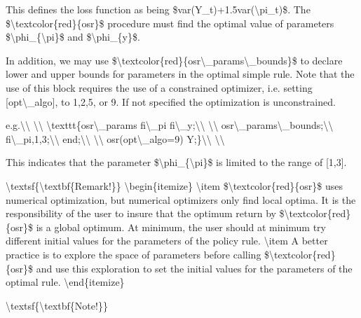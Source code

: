 \documentclass[10pt,math=newtx,citestyle=gb7714-2015,bibstyle=gb7714-2015]{elegantbook}
\begin{document}
	This defines the loss function as being \$var(Y\_t)+1.5var(\textbackslash{}pi\_t)\$. The \$\textbackslash{}textcolor\{red\}\{osr\}\$ procedure must find the optimal value of parameters \$\textbackslash{}phi\_\{\textbackslash{}pi\}\$ and \$\textbackslash{}phi\_\{y\}\$.
	
	In addition, we may use \$\textbackslash{}textcolor\{red\}\{osr\textbackslash{}\_params\textbackslash{}\_bounds\}\$ to declare lower and upper bounds for parameters in the optimal simple rule. Note that the use of this block requires the use of a constrained optimizer, i.e. setting [opt\textbackslash{}\_algo], to 1,2,5, or 9. If not specified the optimization is unconstrained.
	
	e.g.\textbackslash{}\textbackslash{}
	\textbackslash{}\textbackslash{}
	\textbackslash{}texttt\{osr\textbackslash{}\_params fi\textbackslash{}\_pi fi\textbackslash{}\_y;\textbackslash{}\textbackslash{}
	\textbackslash{}\textbackslash{}
	osr\textbackslash{}\_params\textbackslash{}\_bounds;\textbackslash{}\textbackslash{}
	fi\textbackslash{}\_pi,1,3;\textbackslash{}\textbackslash{}
	end;\textbackslash{}\textbackslash{}
	\textbackslash{}\textbackslash{}
	osr(opt\textbackslash{}\_algo=9) Y;\}\textbackslash{}\textbackslash{}
	\textbackslash{}\textbackslash{}
	
	This indicates that the parameter \$\textbackslash{}phi\_\{\textbackslash{}pi\}\$ is limited to the range of [1,3].
	
	\textbackslash{}textsf\{\textbackslash{}textbf\{Remark!\}\}
	\textbackslash{}begin\{itemize\}
	\textbackslash{}item \$\textbackslash{}textcolor\{red\}\{osr\}\$ uses numerical optimization, but numerical optimizers only find local optima. It is the responsibility of the user to insure that the optimum return by \$\textbackslash{}textcolor\{red\}\{osr\}\$ is a global optimum. At minimum, the user should at minimum try different initial values for the parameters of the policy rule.
	\textbackslash{}item A better practice is to explore the space of parameters before calling \$\textbackslash{}textcolor\{red\}\{osr\}\$ and use this exploration to set the initial values for the parameters of the optimal rule.
	\textbackslash{}end\{itemize\}
	
	\textbackslash{}textsf\{\textbackslash{}textbf\{Note!\}\}
	
\end{document}
